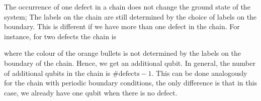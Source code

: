 The occurrence of one defect in a chain does not change the ground state of the system; The labels on the chain are still determined by the choice of labels on the boundary. This is different if we have more than one defect in the chain. For instance, for two defects the chain is
	\begin{figure}[H]
	\end{figure}
\noindent
where the colour of the orange bullets is not determined by the labels on the boundary of the chain. Hence, we get an additional qubit. In general, the number of additional qubits in the chain is $\#\mathrm{defects}-1$. This can be done analogously for the chain with periodic boundary conditions, the only difference is that in this case, we already have one qubit when there is no defect.

